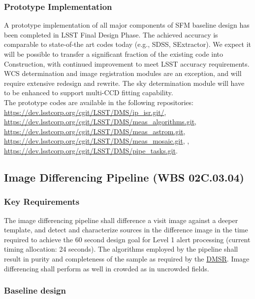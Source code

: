 \documentclass[12pt]{article}
\newcommand{\ds}[2]{{\color{blue} \href{https://docushare.lsstcorp.org/docushare/dsweb/Get/#1}{#2}}\xspace}
\newcommand{\DMSR}{\ds{LSE-61}{DMSR}}
\newcommand{\wbsDiffim}{WBS 02C.03.04}
\begin{document}
\subsubsection{Prototype Implementation}

A prototype implementation of all major components of SFM baseline design has been completed in LSST Final Design Phase. The achieved accuracy is comparable to state-of-the art codes today (e.g., SDSS, SExtractor). We expect it will be possible to transfer a significant fraction of the existing code into Construction, with continued improvement to meet LSST accuracy requirements.
\\

WCS determination and image registration modules are an exception, and will require extensive redesign and rewrite. The sky determination module will have to be enhanced to support multi-CCD fitting capability.
\\

The prototype codes are available in the following repositories: \url{https://dev.lsstcorp.org/cgit/LSST/DMS/ip_isr.git/}, \url{https://dev.lsstcorp.org/cgit/LSST/DMS/meas_algorithms.git}, \url{https://dev.lsstcorp.org/cgit/LSST/DMS/meas_astrom.git}, \url{https://dev.lsstcorp.org/cgit/LSST/DMS/meas_mosaic.git}, , \url{https://dev.lsstcorp.org/cgit/LSST/DMS/pipe_tasks.git}.

\clearpage

\subsection{Image Differencing Pipeline (\wbsDiffim)}

\subsubsection{Key Requirements}

The image differencing pipeline shall difference a visit image against a deeper template, and detect and characterize sources in the difference image in the time required to achieve the 60 second design goal for Level 1 alert processing (current timing allocation: 24 seconds). The algorithms employed by the pipeline shall result in purity and completeness of the sample as required by the \DMSR. Image differencing shall perform as well in crowded as in uncrowded fields.

\subsubsection{Baseline design}
\end{document}

